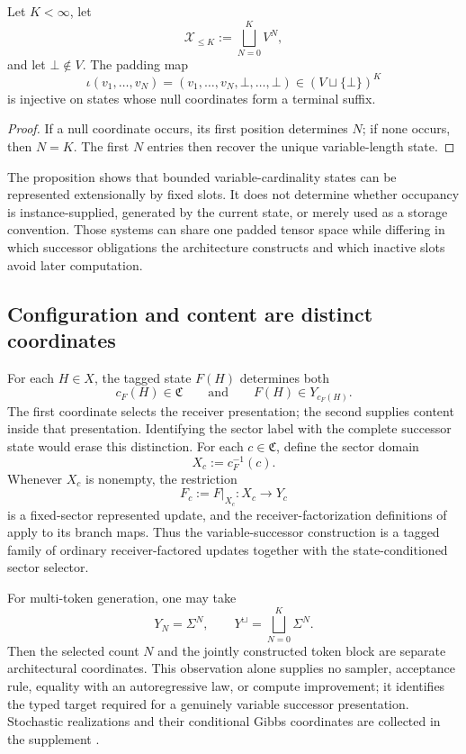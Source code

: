 \begin{proposition}\label{prop:finite-slot-encoding}
Let $K<\infty$, let
\[
\mathcal X_{\le K}:=\bigsqcup_{N=0}^{K}V^N,
\]
and let $\bot\notin V$. The padding map
\[
\iota(v_1,\ldots,v_N)
=(v_1,\ldots,v_N,\bot,\ldots,\bot)
\in(V\sqcup\{\bot\})^K
\]
is injective on states whose null coordinates form a terminal suffix.
\end{proposition}

\begin{proof}
If a null coordinate occurs, its first position determines $N$; if none occurs, then $N=K$. The first $N$ entries then recover the unique variable-length state.
\end{proof}

The proposition shows that bounded variable-cardinality states can be represented extensionally by fixed slots. It does not determine whether occupancy is instance-supplied, generated by the current state, or merely used as a storage convention. Those systems can share one padded tensor space while differing in which successor obligations the architecture constructs and which inactive slots avoid later computation.

\subsection{Configuration and content are distinct coordinates}

For each $H\in X$, the tagged state $F(H)$ determines both
\[
c_F(H)\in\mathfrak C
\qquad\text{and}\qquad
F(H)\in Y_{c_F(H)}.
\]
The first coordinate selects the receiver presentation; the second supplies content inside that presentation. Identifying the sector label with the complete successor state would erase this distinction. For each $c\in\mathfrak C$, define the sector domain
\[
X_c:=c_F^{-1}(c).
\]
Whenever $X_c$ is nonempty, the restriction
\[
F_c:=F|_{X_c}:X_c\to Y_c
\]
is a fixed-sector represented update, and the receiver-factorization definitions of  apply to its branch maps. Thus the variable-successor construction is a tagged family of ordinary receiver-factored updates together with the state-conditioned sector selector.

For multi-token generation, one may take
\[
Y_N=\Sigma^N,
\qquad
Y^{\sqcup}=\bigsqcup_{N=0}^{K}\Sigma^N.
\]
Then the selected count $N$ and the jointly constructed token block are separate architectural coordinates. This observation alone supplies no sampler, acceptance rule, equality with an autoregressive law, or compute improvement; it identifies the typed target required for a genuinely variable successor presentation. Stochastic realizations and their conditional Gibbs coordinates are collected in the supplement \citep{gloeckle2024multitoken,cai2024medusa,chen2023speculative}.
